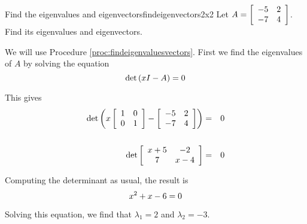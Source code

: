 \begin{example}{Find the eigenvalues and eigenvectors}{findeigenvectors2x2}
Let $A = \left[ \begin{array}{rr}
-5 & 2 \\
-7 & 4 
\end{array} \right]$. Find its eigenvalues and eigenvectors. 
\end{example}

\begin{solution}
We will use Procedure \ref{proc:findeigenvaluesvectors}. First we find the eigenvalues of $A$ by solving the equation
\[
\det \left( x I - A \right) =0
\]

This gives
\begin{eqnarray*}
\det \left( x \left[ \begin{array}{rr}
1 & 0 \\
0 & 1 
\end{array} \right] 
- 
\left[ \begin{array}{rr}
-5 & 2 \\
-7 & 4
\end{array} \right] \right) &=& 0 \\
\\
\det \left[ \begin{array}{cc}
x+5 & -2 \\
7 & x-4 
\end{array} \right] &=& 0 
\end{eqnarray*}

Computing the determinant as usual, the result is
\[
x^2 + x - 6 = 0
\]

Solving this equation, we find that $\lambda_1 = 2$ and $\lambda_2 = -3$. 


\end{solution}
